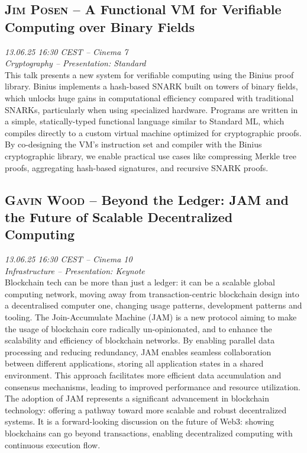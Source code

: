 \subsection {\textsc{Jim Posen}  -- A Functional VM for Verifiable Computing over Binary Fields} \noindent \textit {13.06.25 16:30 CEST -- Cinema 7\\ Cryptography -- Presentation: Standard}\\[1em] This talk presents a new system for verifiable computing using the Binius proof library. Binius implements a hash-based SNARK built on towers of binary fields, which unlocks huge gains in computational efficiency compared with traditional SNARKs, particularly when using specialized hardware. Programs are written in a simple, statically-typed functional language similar to Standard ML, which compiles directly to a custom virtual machine optimized for cryptographic proofs. By co-designing the VM’s instruction set and compiler with the Binius cryptographic library, we enable practical use cases like compressing Merkle tree proofs, aggregating hash-based signatures, and recursive SNARK proofs.

\clearpage
\subsection {\textsc{Gavin Wood}  -- Beyond the Ledger: JAM and the Future of Scalable Decentralized Computing} \noindent \textit {13.06.25 16:30 CEST -- Cinema 10\\ Infrastructure -- Presentation: Keynote}\\[1em] Blockchain tech can be more than just a ledger: it can be a scalable global computing network, moving away from transaction-centric blockchain design into a decentralised computer one, changing usage patterns, development patterns and tooling. The Join-Accumulate Machine (JAM) is a new protocol aiming to make the usage of blockchain core radically un-opinionated, and to enhance the scalability and efficiency of blockchain networks. By enabling parallel data processing and reducing redundancy, JAM enables seamless collaboration between different applications, storing all application states in a shared environment. This approach facilitates more efficient data accumulation and consensus mechanisms, leading to improved performance and resource utilization. The adoption of JAM represents a significant advancement in blockchain technology: offering a pathway toward more scalable and robust decentralized systems. It is a forward-looking discussion on the future of Web3: showing blockchains can go beyond transactions, enabling decentralized computing with continuous execution flow.

